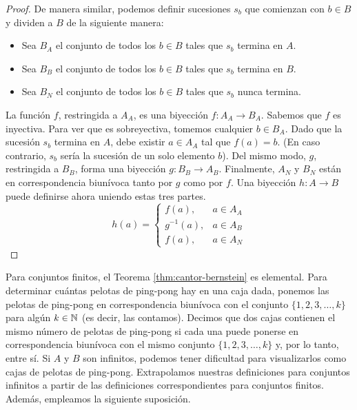 \documentclass[12pt,a4paper]{book}
\begin{document}
\begin{proof}
        De manera similar, podemos definir sucesiones $s_{b}$ que comienzan con $b\in B$ y dividen a $B$ de la siguiente
        manera:

        \begin{itemize}
            \item[$\bullet$] Sea $B_{A}$ el conjunto de todos los $b\in B$ tales que $s_{b}$ termina en $A$.
            \item[$\bullet$] Sea $B_{B}$ el conjunto de todos los $b\in B$ tales que $s_{b}$ termina en $B$.
            \item[$\bullet$] Sea $B_{N}$ el conjunto de todos los $b\in B$ tales que $s_{b}$ nunca termina.
        \end{itemize}

        La función $f$, restringida a $A_{A}$, es una biyección $f:A_{A}\rightarrow B_{A}$. Sabemos que $f$ es inyectiva.
        Para ver que es sobreyectiva, tomemos cualquier $b\in B_{A}$. Dado que la sucesión $s_{b}$ termina en $A$, debe
        existir $a\in A_{A}$ tal que $f(a)=b$. (En caso contrario, $s_{b}$ sería la sucesión de un solo elemento $b$).
        Del mismo modo, $g$, restringida a $B_{B}$, forma una biyección $g:B_{B}\rightarrow A_{B}$. Finalmente, $A_{N}$ y
        $B_{N}$ están en correspondencia biunívoca tanto por $g$ como por $f$. Una biyección $h:A\rightarrow B$ puede
        definirse ahora uniendo estas tres partes.
        \begin{equation*}
            h(a)=
            \begin{cases}
                f(a), & a\in A_{A}\\
                g^{-1}(a), & a\in A_{B}\\
                f(a), & a\in A_{N}
            \end{cases}
        \end{equation*}
    \end{proof}

    Para conjuntos finitos, el Teorema \ref{thm:cantor-bernstein} es elemental. Para determinar cuántas pelotas de
    ping-pong hay en una caja dada, ponemos las pelotas de ping-pong en correspondencia biunívoca con el conjunto
    $\{1,2,3,\dots,k\}$ para algún $k\in\mathbb{N}$ (es decir, las contamos). Decimos que dos cajas contienen el mismo número de
    pelotas de ping-pong si cada una puede ponerse en correspondencia biunívoca con el mismo conjunto $\{1,2,3,\dots,k\}$
    y, por lo tanto, entre sí. Si $A$ y $B$ son infinitos, podemos tener dificultad para visualizarlos como cajas de
    pelotas de ping-pong. Extrapolamos nuestras definiciones para conjuntos infinitos a partir de las definiciones
    correspondientes para conjuntos finitos. Además, empleamos la siguiente suposición.
\end{document}
